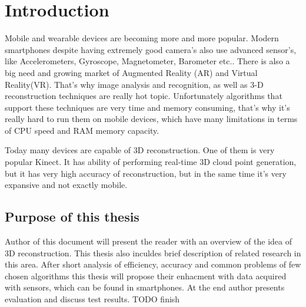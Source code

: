 
\chapter{Introduction}
\ifpdf
    \graphicspath{{1_introduction/figures/PNG/}{1_introduction/figures/PDF/}{1_introduction/figures/}}
\else
    \graphicspath{{1_introduction/figures/EPS/}{1_introduction/figures/}}
\fi


Mobile and wearable devices are becoming more and more popular. Modern smartphones despite having extremely good camera's also use advanced sensor's, like Accelerometers, Gyroscope, Magnetometer, Barometer etc.. There is also a big need and growing market of Augmented Reality (AR) and Virtual Reality(VR). That's why image analysis and recognition, as well as 3-D reconstruction techniques are really hot topic. Unfortunately algorithms that support these techniques are very time and memory consuming, that's why it's really hard to run them on mobile devices, which have many limitations in terms of CPU speed and RAM memory capacity.

Today many devices are capable of 3D reconstruction. One of them is very popular Kinect\cite{kinect}. It has ability of performing real-time 3D cloud point generation, but it has very high accuracy of reconstruction, but in the same time it's very expansive and not exactly mobile.

\section{Purpose of this thesis} %
Author of this document will present the reader with an overview of the idea of 3D reconstruction. This thesis also inculdes brief description of related research in this area. After short analysis of efficiency, accuracy and common problems of few chosen algorithms this thesis will propose their enhacment with data acquired with sensors, which can be found in smartphones. At the end author presents evaluation and discuss test results. TODO finish

